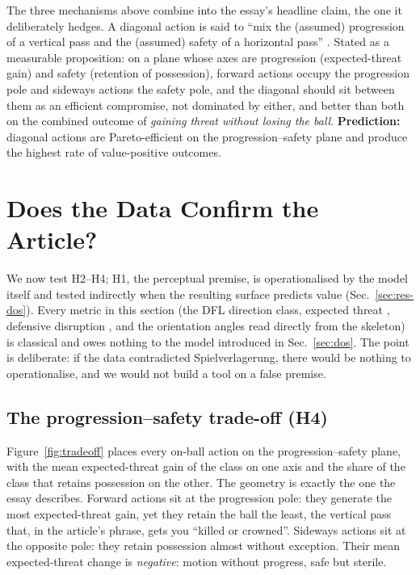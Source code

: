 \documentclass[11pt]{article}
\begin{document}
The three mechanisms above combine into the essay's headline claim, the
one it deliberately hedges. A diagonal action is said to ``mix the
(assumed) progression of a vertical pass and the (assumed) safety of a
horizontal pass'' \citep{spielverlagerung2025}. Stated as a measurable
proposition: on a plane whose axes are progression (expected-threat gain)
and safety (retention of possession), forward actions occupy the
progression pole and sideways actions the safety pole, and the diagonal
should sit between them as an efficient compromise, not dominated by
either, and better than both on the combined outcome of \emph{gaining
threat without losing the ball}. \textbf{Prediction:} diagonal actions are
Pareto-efficient on the progression--safety plane and produce the highest
rate of value-positive outcomes.

\section{Does the Data Confirm the Article?}
\label{sec:validate}

We now test H2--H4; H1, the perceptual premise, is operationalised by the
model itself and tested indirectly when the resulting surface predicts
value (Sec.~\ref{sec:res-dos}). Every metric in this section (the DFL
direction
class, expected threat \citep{singh2018}, defensive disruption
\citep{goes2019,forcher2021}, and the orientation angles read directly
from the skeleton) is classical and owes nothing to the model
introduced in Sec.~\ref{sec:dos}. The point is deliberate: if the data
contradicted Spielverlagerung, there would be nothing to operationalise,
and we would not build a tool on a false premise.

\subsection{The progression--safety trade-off (H4)}
\label{sec:res-tradeoff}

Figure~\ref{fig:tradeoff} places every on-ball action on the
progression--safety plane, with the mean expected-threat gain of the class
on one axis and the share of the class that retains possession on the
other. The geometry is exactly the one the essay describes. Forward
actions sit at the progression pole: they generate the most
expected-threat gain, yet they retain the ball the least, the vertical
pass that, in the article's phrase, gets you ``killed or crowned''.
Sideways actions sit at the opposite pole: they retain possession almost
without exception. Their mean expected-threat change is
\emph{negative}: motion without progress, safe but sterile.
\end{document}
